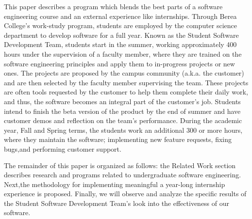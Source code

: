 This paper describes a program which blends the best parts of a software engineering course and an external experience like internships. Through Berea College's work-study program, students are employed by the computer science department to develop software for a full year. Known as the Student Software Development Team, students start in the summer, working approximately 400 hours under the supervision of a faculty member, where they are trained on the software engineering principles and apply them to in-progress projects or new ones. The projects are proposed by the campus community (a.k.a. the customer) and are then selected by the faculty member supervising the team. These projects are often tools requested by the customer to help them complete their daily work, and thus, the software becomes an integral part of the customer's job. Students intend to finish the beta version of the product by the end of summer and have customer demos and reflection on the team's performance. During the academic year, Fall and Spring terms, the students work an additional 300 or more hours, where they maintain the software; implementing new feature requests, fixing bugs,and performing customer support. 

The remainder of this paper is organized as follows: the Related Work section describes research and programs related to undergraduate software engineering. Next,the methodology for implementing meaningful a year-long internship experience is proposed. Finally, we will observe and analyze the specific results of the Student Software Development Team's look into the effectiveness of our software.


